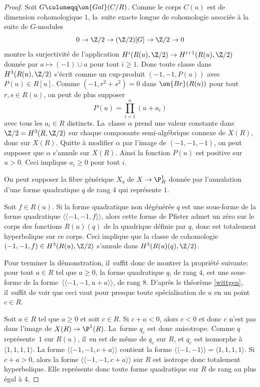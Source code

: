 \begin{proof}
Soit $G\coloneqq \on{Gal}(C/R)$. Comme le corps $C(u)$ est de dimension cohomologique $1$, la~suite exacte longue de cohomologie associée à la suite de $G$-modules \[0\to \Z/2\to (\Z/2)[G]\to \Z/2\to 0\] montre la surjectivité de l'application $H^i(R(u),\Z/2)\to H^{i+1}(R(u),\Z/2)$ donnée par $a\mapsto (-1)\cup a$ pour tout $i\geq 1$. Donc toute classe dans $H^3(R(u),\Z/2)$ s'écrit
comme un cup-produit $(-1,-1,P(u))$ avec $P(u)\in R[u]$. Comme $(-1,r^2+s^2)=0$ dans $\on{Br}(R(u))$ pour tout $r,s\in R(u)$, on peut de plus supposer
\[
P(u) = \prod_{i=1}^n (u+a_{i})
\]
avec tous les $a_{i} \in R$ distincts. La~classe $\alpha$ prend une valeur constante dans $\Z/2= H^3(R, \Z/2)$ sur chaque composante semi-algébrique connexe de $X(R)$, donc sur $X(R)$. Quitte à modifier $\alpha$ par l'image de $(-1,-1,-1)$, on peut supposer que $\alpha$ s'annule sur $X(R)$. Ainsi la fonction $P(u) $ est positive sur $u>0$. Ceci implique $a_{i} \geq 0$ pour tout $i$.

On peut supposer la fibre générique $X_{\eta}$ de $X\to \P^1_R$ donnée par l'annulation d'une forme quadratique $q$ de rang $4$ qui représente $1$.

Soit $f\in R(u)$.
Si la forme quadratique non dégénérée $q$ est une sous-forme de la forme quadratique
$\langle \!\langle -1,-1, f\rangle \!\rangle $, alors cette forme de Pfister admet un zéro sur le corps des fonctions
$R(u)(q)$ de la quadrique définie par $q$, donc est totalement hyperbolique sur
ce corps. Ceci implique que la classe de cohomologie $(-1,-1,f) \in H^3(R(u),\Z/2)$
s'annule dans $H^3(R(u)(q),\Z/2)$.

Pour terminer la démonstration, il~suffit donc de montrer la propriété suivante:
pour tout $a\!\in\! R$ tel que $a \!\geq\!0$, la forme quadratique $q$, de rang $4$,
est une sous-forme de la forme~\hbox{$\!\langle \!\langle -1,-1, u+a \rangle \!\rangle$}, de rang 8.
D'après le théorème \ref{wittgen}, il~suffit de voir
que ceci vaut pour presque toute spécialisation de $u$
en un point $c\in R$.

Soit $a\in R$ tel que $a\geq 0$ et soit $c\in R$.
Si $c+a <0$, alors $c<0$ et donc $c$ n'est pas dans l'image de
$X(R) \to \P^1(R)$. La~forme $q_{c}$ est donc anisotrope.
Comme $q$ représente~$1$ sur $R(u)$, il~en est de même de $q_{c}$ sur $R$,
et $q_{c}$ est isomorphe à $\langle 1,1,1,1\rangle $.
La forme $\langle \!\langle-1,-1, c+a \rangle \!\rangle$ contient la forme
$\langle \!\langle -1,-1 \rangle \!\rangle=\langle 1,1,1,1 \rangle$. Si $c+a>0$, alors la forme $\langle \!\langle -1,-1, c+a\rangle \!\rangle$ sur $R$ est isotrope donc totalement
hyperbolique. Elle représente donc toute forme quadratique sur $R$
de rang au plus égal à $4$.


\end{proof}
